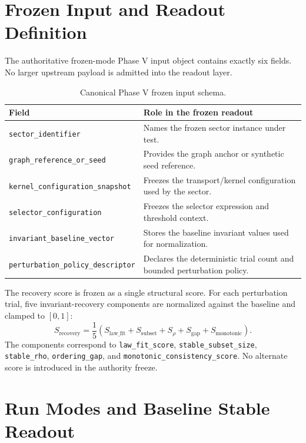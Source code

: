 \documentclass[11pt]{article}
\begin{document}
\section{Frozen Input and Readout Definition}

The authoritative frozen-mode Phase V input object contains exactly six fields. No larger upstream payload is admitted into the readout layer.

\begin{table}[t]
\centering
\small
\begin{tabular}{@{}p{2.1in}p{4.2in}@{}}
\toprule
Field & Role in the frozen readout \\
\midrule
\texttt{sector\_identifier} & Names the frozen sector instance under test. \\
\texttt{graph\_reference\_or\_seed} & Provides the graph anchor or synthetic seed reference. \\
\texttt{kernel\_configuration\_snapshot} & Freezes the transport/kernel configuration used by the sector. \\
\texttt{selector\_configuration} & Freezes the selector expression and threshold context. \\
\texttt{invariant\_baseline\_vector} & Stores the baseline invariant values used for normalization. \\
\texttt{perturbation\_policy\_descriptor} & Declares the deterministic trial count and bounded perturbation policy. \\
\bottomrule
\end{tabular}
\caption{Canonical Phase V frozen input schema.}
\label{tab:schema}
\end{table}

The recovery score is frozen as a single structural score. For each perturbation trial, five invariant-recovery components are normalized against the baseline and clamped to $[0,1]$:
\[
S_{\mathrm{recovery}}=\frac{1}{5}
\left(
S_{\mathrm{law\_fit}}+
S_{\mathrm{subset}}+
S_{\rho}+
S_{\mathrm{gap}}+
S_{\mathrm{monotonic}}
\right).
\]
The components correspond to \texttt{law\_fit\_score}, \texttt{stable\_subset\_size}, \texttt{stable\_rho}, \texttt{ordering\_gap}, and \texttt{monotonic\_consistency\_score}. No alternate score is introduced in the authority freeze.

\section{Run Modes and Baseline Stable Readout}
\end{document}
